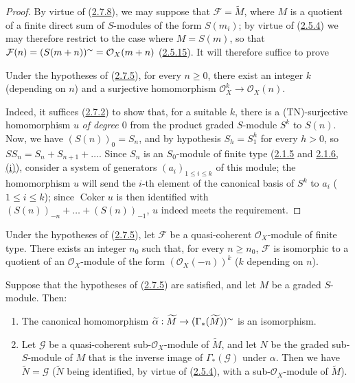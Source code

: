 \begin{proof}
By virtue of (\hyperref[II.2.7.8]{2.7.8}), we may suppose that
$\mathcal{F}=\widetilde{M}$, where $M$ is a quotient of a finite direct sum of
$S$-modules of the form $S(m_i)$; by virtue of
(\hyperref[II.2.5.4]{2.5.4}) we may therefore restrict to the case where
$M=S(m)$, so that $\mathcal{F}(n)=(S(m+n))^{\sim}
=\mathcal{O}_X(m+n)$ (\hyperref[II.2.5.15]{2.5.15}). It will therefore
suffice to prove

\begin{lemma}[2.7.9.1]
\label{II.2.7.9.1}
Under the hypotheses of \textup{(\hyperref[II.2.7.5]{2.7.5})}, for every $n\geq0$,
there exist an integer $k$ (depending on $n$) and a surjective homomorphism
$\mathcal{O}_X^k\to\mathcal{O}_X(n)$.
\end{lemma}

Indeed, it suffices (\hyperref[II.2.7.2]{2.7.2}) to show that, for a
suitable $k$, there is a (TN)-surjective homomorphism $u$ \emph{of degree $0$}
from the product graded $S$-module $S^k$ to $S(n)$. Now, we have
$(S(n))_0=S_n$, and by hypothesis $S_h=S_1^h$ for every $h>0$, so
$SS_n=S_n+S_{n+1}+\ldots$. Since $S_n$ is an $S_0$-module of finite type
(\hyperref[II.2.1.5]{2.1.5} and
\hyperref[II.2.1.6]{2.1.6, (i)}), consider a system of generators
$(a_i)_{1\leq i\leq k}$ of this module; the homomorphism $u$ will send the
$i$-th element of the canonical basis of $S^k$ to $a_i$ ($1\leq i\leq k$);
since $\operatorname{Coker}u$ is then identified with
$(S(n))_{-n}+\ldots+(S(n))_{-1}$, $u$ indeed meets the requirement.
\end{proof}

\begin{corollary}[2.7.10]
\label{II.2.7.10}
Under the hypotheses of \textup{(\hyperref[II.2.7.5]{2.7.5})}, let $\mathcal{F}$ be
a quasi-coherent $\mathcal{O}_X$-module of finite type. There exists an
integer $n_0$ such that, for every $n\geq n_0$, $\mathcal{F}$ is isomorphic to
a quotient of an $\mathcal{O}_X$-module of the form $(\mathcal{O}_X(-n))^k$
($k$ depending on $n$).
\end{corollary}

\begin{proposition}[2.7.11]
\label{II.2.7.11}
Suppose that the hypotheses of
\textup{(\hyperref[II.2.7.5]{2.7.5})} are satisfied, and let $M$ be a graded
$S$-module. Then:
\begin{enumerate}
  \item[\rm(i)] The canonical homomorphism
    $\widetilde{\alpha}:\widetilde{M}\to
    (\Gamma_*(\widetilde{M}))^{\sim}$ is an isomorphism.
  \item[\rm(ii)] Let $\mathcal{G}$ be a quasi-coherent
    sub-$\mathcal{O}_X$-module of $\widetilde{M}$, and let $N$ be the graded
    sub-$S$-module of $M$ that is the inverse image of $\Gamma_*(\mathcal{G})$
    under $\alpha$. Then we have $\widetilde{N}=\mathcal{G}$ ($\widetilde{N}$
    being identified, by virtue of \textup{(\hyperref[II.2.5.4]{2.5.4})}, with a
    sub-$\mathcal{O}_X$-module of $\widetilde{M}$).
\end{enumerate}
\end{proposition}

